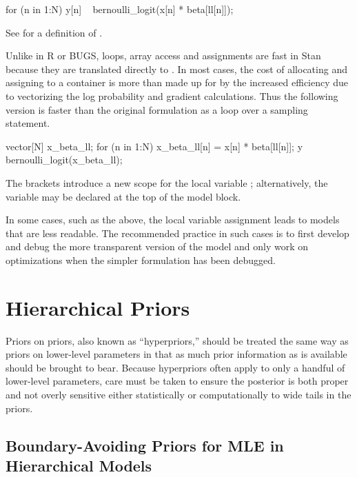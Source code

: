 \begin{stancode}
  for (n in 1:N)
    y[n] ~ bernoulli_logit(x[n] * beta[ll[n]]);    
\end{stancode}
%
See  for a definition of
.

Unlike in R or BUGS, loops, array access and assignments are fast in
Stan because they are translated directly to \Cpp.  In most cases, the
cost of allocating and assigning to a container is more than made up
for by the increased efficiency due to vectorizing the log probability
and gradient calculations.  Thus the following version is faster than
the original formulation as a loop over a sampling statement.
%

\begin{stancode}
  {
    vector[N] x_beta_ll;
    for (n in 1:N)
      x_beta_ll[n] = x[n] * beta[ll[n]];
    y ~ bernoulli_logit(x_beta_ll);
  }
\end{stancode}
%
The brackets introduce a new scope for the local variable
; alternatively, the variable may be declared at the
top of the model block.  

In some cases, such as the above, the local variable assignment leads
to models that are less readable.  The recommended practice in such
cases is to first develop and debug the more transparent version of
the model and only work on optimizations when the simpler formulation
has been debugged.


\section{Hierarchical Priors}\label{hierarchical-priors.section}

Priors on priors, also known as ``hyperpriors,'' should be treated the
same way as priors on lower-level parameters in that as much prior
information as is available should be brought to bear.  Because
hyperpriors often apply to only a handful of lower-level parameters,
care must be taken to ensure the posterior is both proper and not
overly sensitive either statistically or computationally to wide tails
in the priors.

\subsection{Boundary-Avoiding Priors for MLE in Hierarchical Models}

